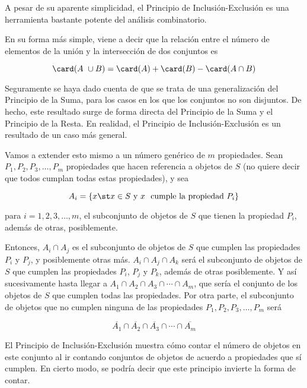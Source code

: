 



A pesar de su aparente simplicidad, el Principio de Inclusión-Exclusión es
una herramienta bastante potente del análisis combinatorio.

En su forma más simple, viene a decir que la relación entre el número de
elementos de la unión y la intersección de dos conjuntos es

$$ \card(A \cup B) = \card(A) + \card(B) - \card(A \cap B) $$

Seguramente se haya dado cuenta de que se trata de una generalización del
Principio de la Suma, para los casos en los que los conjuntos no son
disjuntos. De hecho, este resultado surge de forma directa del Principio de
la Suma y el Principio de la Resta. En realidad, el Principio de
Inclusión-Exclusión es un resultado de un caso más general.

Vamos a extender esto mismo a un número genérico de $m$ propiedades. Sean
$P_1, P_2, P_3, \ldots, P_m$ propiedades que hacen referencia a objetos de
$S$ (no quiere decir que todos cumplan todas estas propiedades), y sea

$$ A_i = \{x \st x \in S \ \text{y} \ x \ \text{cumple la propiedad} \ P_i\}
$$

\noindent para $i = 1, 2, 3, \ldots, m$, el subconjunto de objetos de $S$
que tienen la propiedad $P_i$, además de otras, posiblemente.

Entonces, $A_i \cap A_j$ es el subconjunto de objetos de $S$ que cumplen las
propiedades $P_i$ y $P_j$, y posiblemente otras más. $A_i \cap A_j \cap A_k$
será el subconjunto de objetos de $S$ que cumplen las propiedades $P_i$,
$P_j$ y $P_k$, además de otras posiblemente. Y así sucesivamente hasta
llegar a $A_1 \cap A_2 \cap A_3 \cap \cdots \cap A_m$, que sería el conjunto
de los objetos de $S$ que cumplen todas las propiedades. Por otra parte, el
subconjunto de objetos que no cumplen ninguna de las propiedades $P_1, P_2,
P_3, \ldots, P_m$ será

$$ \overline{A_1} \cap \overline{A_2} \cap \overline{A_3} \cap \cdots \cap
\overline{A_m} $$

El Principio de Inclusión-Exclusión muestra cómo contar el número de objetos
en este conjunto al ir contando conjuntos de objetos de acuerdo a
propiedades que sí cumplen. En cierto modo, se podría decir que este
principio invierte la forma de contar.

